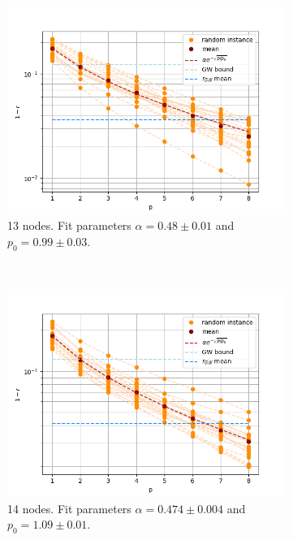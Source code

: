 \begin{figure}[H]
\begin{subfigure}[t]{0.45\textwidth}
		\centering
		\includegraphics[width=\textwidth]{figures/interp/fom_er050_n13}
		\caption{13 nodes. Fit parameters $\alpha = 0.48 \pm 0.01$ and $p_0 = 0.99 \pm 0.03$.}
	\end{subfigure}
	~
	\begin{subfigure}[t]{0.45\textwidth}
		\centering
		\includegraphics[width=\textwidth]{figures/interp/fom_er050_n14}
		\caption{14 nodes. Fit parameters $\alpha = 0.474 \pm 0.004$ and $p_0 = 1.09 \pm 0.01$.}
	\end{subfigure}
	\\
	\begin{subfigure}[t]{0.45\textwidth}
		\centering

\end{subfigure}
\end{figure}
